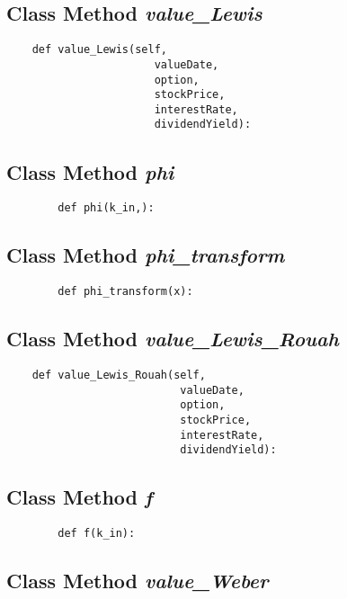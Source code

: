 \documentclass[twoside,11pt]{book}
\begin{document}
\subsection{Class Method {\it value\_Lewis}}


\begin{lstlisting}
    def value_Lewis(self,
                       valueDate,
                       option,
                       stockPrice,
                       interestRate,
                       dividendYield):
\end{lstlisting}

\subsection{Class Method {\it phi}}


\begin{lstlisting}
        def phi(k_in,):
\end{lstlisting}

\subsection{Class Method {\it phi\_transform}}


\begin{lstlisting}
        def phi_transform(x):
\end{lstlisting}

\subsection{Class Method {\it value\_Lewis\_Rouah}}


\begin{lstlisting}
    def value_Lewis_Rouah(self,
                           valueDate,
                           option,
                           stockPrice,
                           interestRate,
                           dividendYield):
\end{lstlisting}

\subsection{Class Method {\it f}}


\begin{lstlisting}
        def f(k_in):
\end{lstlisting}

\subsection{Class Method {\it value\_Weber}}
\end{document}
